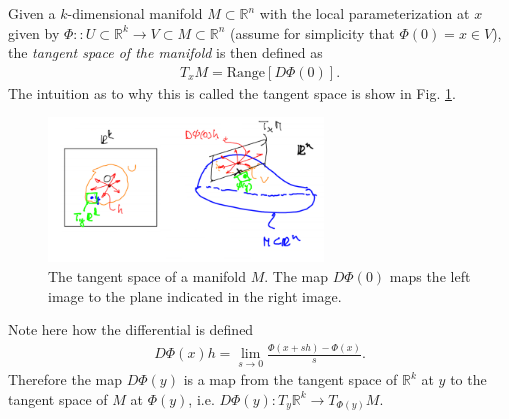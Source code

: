 \begin{definition}
	Given a $k$-dimensional manifold $M\subset \mathbb{R}^{n}$ with the local parameterization at $x$ given by $\Phi:: U\subset \mathbb{R}^k \to V\subset M \subset \mathbb{R}^n$ (assume for simplicity that $\Phi(0)=x\in V$), the \emph{tangent space of the manifold} is then defined as
	\begin{align}
		\boxed{
			T_{x}M= \textrm{Range} [D\Phi(0)].
		}
	\end{align}
	The intuition as to why this is called the tangent space is show in Fig. \ref{fig:tangent_space_def}.
	\begin{figure}[h!]
		\centering
		\includegraphics[width=0.65\textwidth]{figures/ch9/6tangent_space_def.png}
		\caption{The tangent space of a manifold $M$. The map $D\Phi(0)$ maps the left image to the plane indicated in the right image.}
		\label{fig:tangent_space_def}
	\end{figure}
\end{definition}

Note here how the differential is defined
\begin{align}
	D \Phi(x)h = \lim_{s \to 0} \frac{\Phi(x + sh) - \Phi(x)}{s}.
\end{align}
Therefore the map $D\Phi(y)$ is a map from the tangent space of $\mathbb{R}^{k}$ at $y$ to the tangent space of $M$ at $\Phi(y)$, i.e. $D\Phi(y): T_{y}\mathbb{R}^{k}\to T_{\Phi(y)}M$. 

